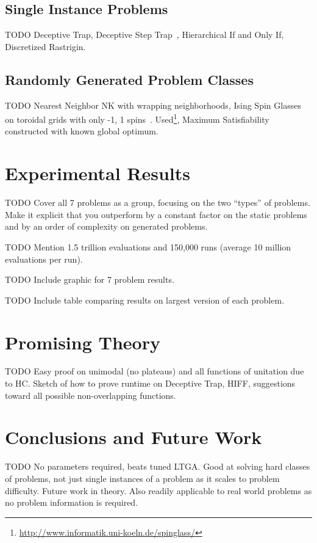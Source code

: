 \documentclass{sig-alternate}
\begin{document}
\subsection{Single Instance Problems}
TODO Deceptive Trap, Deceptive Step Trap~\cite{goldman:2012:ltga}, Hierarchical If
and Only If, Discretized Rastrigin.

\subsection{Randomly Generated Problem Classes}
TODO Nearest Neighbor NK with wrapping neighborhoods, Ising Spin Glasses on toroidal
grids with only -1, 1 spins~\cite{saul:1994:spinglass}.
Used\footnote{\url{http://www.informatik.uni-koeln.de/spinglass/}}, Maximum Satisfiability constructed with known global
optimum.

\section{Experimental Results}
TODO Cover all 7 problems as a group, focusing on the two ``types'' of problems.
Make it explicit that you outperform by a constant factor on the static problems
and by an order of complexity on generated problems.

TODO Mention 1.5 trillion evaluations and 150,000 runs (average 10 million evaluations per run).

TODO Include graphic for 7 problem results.

TODO Include table comparing results on largest version of each problem.

\section{Promising Theory}
TODO Easy proof on unimodal (no plateaus) and all functions of unitation due to HC.
Sketch of how to prove runtime on Deceptive Trap, HIFF, suggestions toward all
possible non-overlapping functions.

\section{Conclusions and Future Work}
TODO No parameters required, beats tuned LTGA.  Good at solving hard classes
of problems, not just single instances of a problem as it scales to problem difficulty.
Future work in theory.  Also readily applicable to real world problems as no
problem information is required.

%

%
%
\balancecolumns
\end{document}

